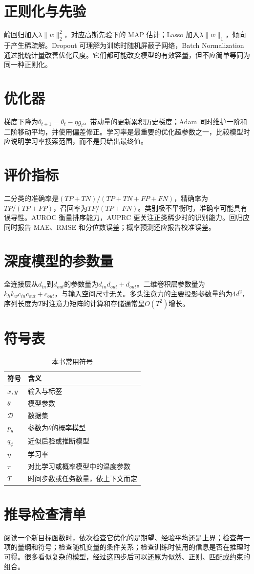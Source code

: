 \section{正则化与先验}
岭回归加入$\lambda\|w\|_2^2$，对应高斯先验下的 MAP 估计；Lasso 加入$\lambda\|w\|_1$，倾向于产生稀疏解。Dropout 可理解为训练时随机屏蔽子网络，Batch Normalization 通过批统计量改善优化尺度。它们都可能改变模型的有效容量，但不应简单等同为同一种正则化。

\section{优化器}
梯度下降为$\theta_{t+1}=\theta_t-\eta g_t$。带动量的更新累积历史梯度；Adam 同时维护一阶和二阶移动平均，并使用偏差修正。学习率是最重要的优化超参数之一，比较模型时应说明学习率搜索范围，而不是只给出最终值。

\section{评价指标}
二分类的准确率是$(TP+TN)/(TP+TN+FP+FN)$，精确率为$TP/(TP+FP)$，召回率为$TP/(TP+FN)$。类别极不平衡时，准确率可能具有误导性。AUROC 衡量排序能力，AUPRC 更关注正类稀少时的识别能力。回归应同时报告 MAE、RMSE 和分位数误差；概率预测还应报告校准误差。

\section{深度模型的参数量}
全连接层从$d_{in}$到$d_{out}$的参数量为$d_{in}d_{out}+d_{out}$。二维卷积层参数量为$k_hk_wc_{in}c_{out}+c_{out}$，与输入空间尺寸无关。多头注意力的主要投影参数量约为$4d^2$，序列长度为$T$时注意力矩阵的计算和存储通常呈$O(T^2)$增长。

\section{符号表}
\begin{table}[htbp]
\centering
\caption{本书常用符号}
\begin{tabular}{ll}
\toprule
符号 & 含义\\
\midrule
$x,y$ & 输入与标签\\
$\theta$ & 模型参数\\
$\mathcal{D}$ & 数据集\\
$p_\theta$ & 参数为$\theta$的概率模型\\
$q_\phi$ & 近似后验或推断模型\\
$\eta$ & 学习率\\
$\tau$ & 对比学习或概率模型中的温度参数\\
$T$ & 时间步数或任务数量，依上下文而定\\
\bottomrule
\end{tabular}
\end{table}

\section{推导检查清单}
阅读一个新目标函数时，依次检查它优化的是期望、经验平均还是上界；检查每一项的量纲和符号；检查随机变量的条件关系；检查训练时使用的信息是否在推理时可得。很多看似复杂的模型，经过这四步后可以还原为似然、正则、匹配或约束的组合。